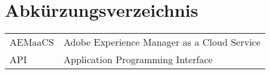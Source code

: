 \section{Abkürzungsverzeichnis}

\begin{longtable}{p{6 cm}p{9 cm}}
    AEMaaCS & Adobe Experience Manager as a Cloud Service \\
    API & Application Programming Interface \\
\end{longtable}
